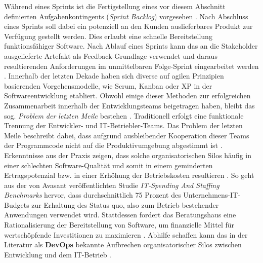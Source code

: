 \vspace*{-15mm}
Während eines Sprints ist die Fertigstellung eines vor diesem Abschnitt definierten Aufgabenkontingents (\textit{Sprint Backlog}) vorgesehen \cite[194]{.2013}. Nach Abschluss eines Sprints soll dabei ein potenziell an den Kunden auslieferbares Produkt zur Verfügung gestellt werden. Dies erlaubt eine schnelle Bereitstellung funktionsfähiger Software. Nach Ablauf eines Sprints kann das an die Stakeholder ausgelieferte Artefakt als Feedback-Grundlage verwendet und daraus resultierenden Anforderungen im unmittelbaren Folge-Sprint eingearbeitet werden \cite[S. 180 ff.]{Gloger.2016b}.
Innerhalb der letzten Dekade haben sich diverse auf agilen Prinzipien basierenden Vorgehensmodelle, wie Scrum, Kanban oder \ac{XP} in der Softwareentwicklung etabliert. Obwohl einige dieser Methoden zur erfolgreichen Zusammenarbeit innerhalb der Entwicklungsteams beigetragen haben, bleibt das sog.  \textit{Problem der letzten Meile} bestehen \cite{Qentelli.20230305}. Traditionell erfolgt eine funktionale Trennung der Entwickler- und IT-Betriebler-Teams. Das Problem der letzten Meile beschreibt dabei, dass aufgrund ausbleibender Kooperation dieser Teams der Programmcode nicht auf die Produktivumgebung abgestimmt ist \cite[17]{Huttermann.2012}. Erkenntnisse aus der Praxis zeigen, dass solche organisatorischen Silos häufig in einer schlechten Software-Qualität und somit in einem geminderten Ertragspotenzial bzw. in einer Erhöhung der Betriebskosten resultieren \cite[1]{Halstenberg.2020}. So geht aus der von Avasant veröffentlichten Studie \textit{IT-Spending And Staffing Benchmarks} hervor, dass durchschnittlich 75 Prozent des Unternehmens-IT-Budgets zur Erhaltung des Status quo, also zum Betrieb bestehender Anwendungen verwendet wird. Stattdessen fordert das Beratungshaus eine Rationalisierung der Bereitstellung von Software, um finanzielle Mittel für wertschöpfende Investitionen zu maximieren \cite[6]{Avasant.20220728}. Abhilfe schaffen kann das in der Literatur als \textbf{\ac{DevOps}} bekannte Aufbrechen organisatorischer Silos zwischen Entwicklung und dem IT-Betrieb \cite[1]{Halstenberg.2020}. 

